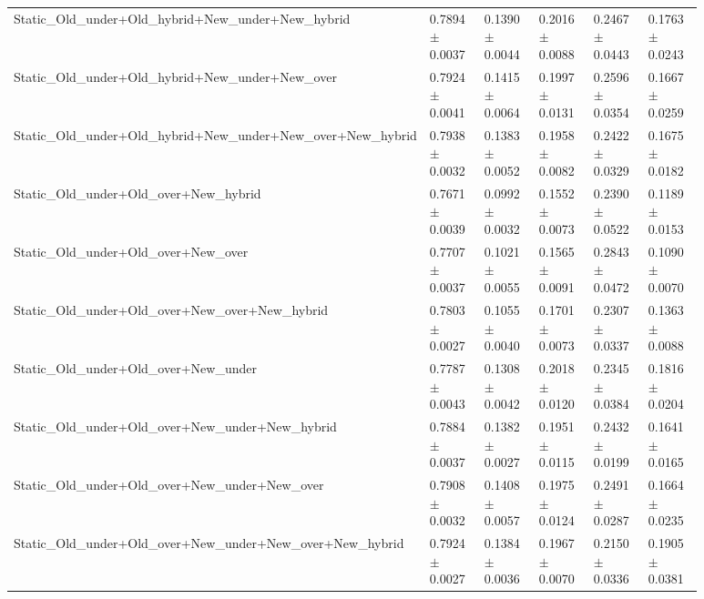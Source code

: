 \begin{longtable}{p{0.28\linewidth}p{0.12\linewidth}p{0.12\linewidth}p{0.12\linewidth}p{0.12\linewidth}p{0.12\linewidth}}
Static\_\allowbreak{}Old\_\allowbreak{}under+Old\_\allowbreak{}hybrid+New\_\allowbreak{}under+New\_\allowbreak{}hybrid & 0.7894\(\pm\)0.0037 & 0.1390\(\pm\)0.0044 & 0.2016\(\pm\)0.0088 & 0.2467\(\pm\)0.0443 & 0.1763\(\pm\)0.0243 \\
Static\_\allowbreak{}Old\_\allowbreak{}under+Old\_\allowbreak{}hybrid+New\_\allowbreak{}under+New\_\allowbreak{}over & 0.7924\(\pm\)0.0041 & 0.1415\(\pm\)0.0064 & 0.1997\(\pm\)0.0131 & 0.2596\(\pm\)0.0354 & 0.1667\(\pm\)0.0259 \\
Static\_\allowbreak{}Old\_\allowbreak{}under+Old\_\allowbreak{}hybrid+New\_\allowbreak{}under+New\_\allowbreak{}over+New\_\allowbreak{}hybrid & 0.7938\(\pm\)0.0032 & 0.1383\(\pm\)0.0052 & 0.1958\(\pm\)0.0082 & 0.2422\(\pm\)0.0329 & 0.1675\(\pm\)0.0182 \\
Static\_\allowbreak{}Old\_\allowbreak{}under+Old\_\allowbreak{}over+New\_\allowbreak{}hybrid & 0.7671\(\pm\)0.0039 & 0.0992\(\pm\)0.0032 & 0.1552\(\pm\)0.0073 & 0.2390\(\pm\)0.0522 & 0.1189\(\pm\)0.0153 \\
Static\_\allowbreak{}Old\_\allowbreak{}under+Old\_\allowbreak{}over+New\_\allowbreak{}over & 0.7707\(\pm\)0.0037 & 0.1021\(\pm\)0.0055 & 0.1565\(\pm\)0.0091 & 0.2843\(\pm\)0.0472 & 0.1090\(\pm\)0.0070 \\
Static\_\allowbreak{}Old\_\allowbreak{}under+Old\_\allowbreak{}over+New\_\allowbreak{}over+New\_\allowbreak{}hybrid & 0.7803\(\pm\)0.0027 & 0.1055\(\pm\)0.0040 & 0.1701\(\pm\)0.0073 & 0.2307\(\pm\)0.0337 & 0.1363\(\pm\)0.0088 \\
Static\_\allowbreak{}Old\_\allowbreak{}under+Old\_\allowbreak{}over+New\_\allowbreak{}under & 0.7787\(\pm\)0.0043 & 0.1308\(\pm\)0.0042 & 0.2018\(\pm\)0.0120 & 0.2345\(\pm\)0.0384 & 0.1816\(\pm\)0.0204 \\
Static\_\allowbreak{}Old\_\allowbreak{}under+Old\_\allowbreak{}over+New\_\allowbreak{}under+New\_\allowbreak{}hybrid & 0.7884\(\pm\)0.0037 & 0.1382\(\pm\)0.0027 & 0.1951\(\pm\)0.0115 & 0.2432\(\pm\)0.0199 & 0.1641\(\pm\)0.0165 \\
Static\_\allowbreak{}Old\_\allowbreak{}under+Old\_\allowbreak{}over+New\_\allowbreak{}under+New\_\allowbreak{}over & 0.7908\(\pm\)0.0032 & 0.1408\(\pm\)0.0057 & 0.1975\(\pm\)0.0124 & 0.2491\(\pm\)0.0287 & 0.1664\(\pm\)0.0235 \\
Static\_\allowbreak{}Old\_\allowbreak{}under+Old\_\allowbreak{}over+New\_\allowbreak{}under+New\_\allowbreak{}over+New\_\allowbreak{}hybrid & 0.7924\(\pm\)0.0027 & 0.1384\(\pm\)0.0036 & 0.1967\(\pm\)0.0070 & 0.2150\(\pm\)0.0336 & 0.1905\(\pm\)0.0381 \\

\end{longtable}
